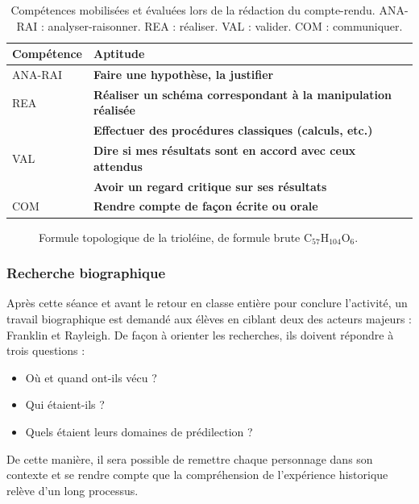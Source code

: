 \documentclass[12pt,a4paper]{article}
\newcommand{\rea}{\colorbox{yellow_c}{\textcolor{yellow_f}{REA}}}
\newcommand{\anarai}{\colorbox{green_c}{\textcolor{green_f}{ANA-RAI}}}
\newcommand{\val}{\colorbox{orange_c}{\textcolor{orange_f}{VAL}}}
\newcommand{\com}{\colorbox{red_c}{\textcolor{red_f}{COM}}}
\begin{document}
\begin{table}
\center
\begin{tabular}{l|l}
\textbf{Compétence} & \textbf{Aptitude} \\
\hline \hline
\anarai 	& \textbf{Faire une hypothèse, la justifier} \\
\hline
\rea			& \textbf{Réaliser un schéma correspondant à la manipulation réalisée} \\
				& \textbf{Effectuer des procédures classiques (calculs, etc.)} \\
\hline
\val			& \textbf{Dire si mes résultats sont en accord avec ceux attendus} \\
 				& \textbf{Avoir un regard critique sur ses résultats} \\
\hline
\com		& \textbf{Rendre compte de façon écrite ou orale}
\end{tabular}
\caption{Compétences mobilisées et évaluées lors de la rédaction du compte-rendu.
\anarai{} : analyser-raisonner.
\rea{} : réaliser.
\val{} : valider.
\com{} : communiquer.}
\label{tab:cptces_cr}
\end{table}

\begin{figure}
\center
{}
\caption{Formule topologique de la trioléine, de formule brute $\text{C}_\text{57}\text{H}_\text{104}\text{O}_\text{6}$.}
\label{fig:trioleine}
\end{figure}

\subsubsection{Recherche biographique}

Après cette séance et avant le retour en classe entière pour conclure l'activité, un travail biographique est demandé aux élèves en ciblant deux des acteurs majeurs : Franklin et Rayleigh.
De façon à orienter les recherches, ils doivent répondre à trois questions :
\begin{itemize}
\item Où et quand ont-ils vécu ?
\item Qui étaient-ils ?
\item Quels étaient leurs domaines de prédilection ?
\end{itemize}
De cette manière, il sera possible de remettre chaque personnage dans son contexte et se rendre compte que la compréhension de l'expérience historique relève d'un long processus.
\end{document}
